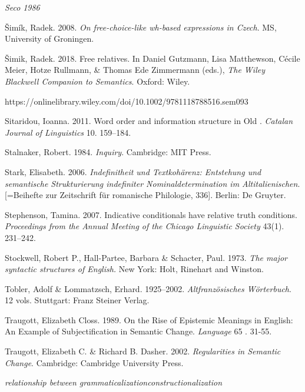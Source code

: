 \documentclass[output=paper]{langscibook}
\begin{document}
\emph{\textmd{Seco}} \emph{\textmd{1986}}

Šimík, Radek. 2008. \textit{On free-choice-like wh-based expressions in Czech}. MS, University of Groningen.

Šimik, Radek. 2018. Free relatives. In Daniel Gutzmann, Lisa Matthewson, Cécile Meier, Hotze Rullmann, \& Thomas Ede Zimmermann (eds.), \textit{The Wiley Blackwell Companion to Semantics}. Oxford: Wiley. 

  https://onlinelibrary.wiley.com/doi/10.1002/9781118788516.sem093

\begin{styleannotationtext}
Sitaridou, Ioanna. 2011. Word order and information structure in Old . \textit{Catalan Journal of Linguistics} 10. 159–184.
\end{styleannotationtext}

Stalnaker, Robert. 1984. \textit{Inquiry}. Cambridge: MIT Press.

Stark, Elisabeth. 2006. \textit{Indefinitheit und Textkohärenz: Entstehung und semantische Strukturierung indefiniter Nominaldetermination im Altitalienischen}. [=Beihefte zur Zeitschrift für romanische Philologie, 336]. Berlin: De Gruyter.

Stephenson, Tamina. 2007. Indicative conditionals have relative truth conditions. \textit{Proceedings from the Annual Meeting of the Chicago Linguistic Society} 43(1). 231–242.

Stockwell, Robert P., Hall-Partee, Barbara \& Schacter, Paul. 1973. \textit{The major syntactic structures of English.} New York: Holt, Rinehart and Winston.

Tobler, Adolf \& Lommatzsch, Erhard. 1925–2002. \textit{Altfranzösisches Wörterbuch}. 12 vols. Stuttgart: Franz Steiner Verlag.

Traugott, Elizabeth Closs. 1989. On the Rise of Epistemic Meanings in English: An Example of Subjectification in Semantic Change. \textit{Language} 65 . 31-55. 

Traugott, Elizabeth C. \& Richard B. Dasher. 2002. \textit{Regularities in Semantic Change}.  Cambridge: Cambridge University Press. 

\begin{styleannotationtext}
 \emph{\textmd{relationship between grammaticalization}}\emph{\textmd{constructionalization}} 
\end{styleannotationtext}
\end{document}
